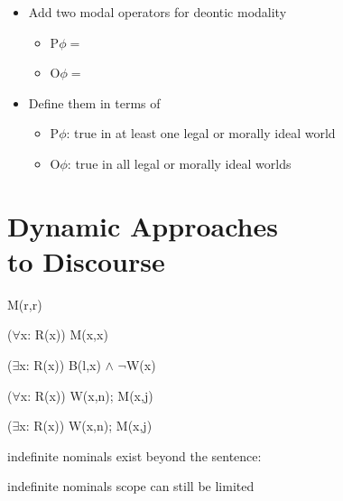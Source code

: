\documentclass[headrule,footrule]{foils}
\begin{document}
\begin{itemize}
\item Add two modal operators for deontic modality
  \begin{itemize}
  \item P$\phi =$ 
  \item O$\phi =$ 
  \end{itemize}
\item Define them in terms of 
  \begin{itemize}
  \item P$\phi$: true in at least one legal or morally ideal world
  \item O$\phi$: true in all legal or morally ideal worlds
  \end{itemize}
\end{itemize}

\section{Dynamic Approaches \\ to Discourse}


\begin{exe}
  \ex 
  \begin{xlist}
    \ex {}
    \ex M(r,r)
  \end{xlist}
 \ex 
  \begin{xlist}
    \ex {}
    \ex ($\forall$x: R(x)) M(x,x)
  \end{xlist}
 \ex 
  \begin{xlist}
    \ex {}
    \ex ($\exists$x: R(x)) B(l,x) $\wedge$ $\neg$W(x)
  \end{xlist}
 \ex 
  \begin{xlist}
    \ex {}
    \ex ($\forall$x: R(x)) W(x,n); M(x,j)\hfill {}
  \end{xlist}
 \ex 
  \begin{xlist}
    \ex {}
    \ex ($\exists$x: R(x)) W(x,n); M(x,j)\hfill {}
  \end{xlist}
  \trans indefinite nominals exist beyond the sentence: 
\ex 
  \begin{xlist}
    \ex {}
  \end{xlist}
  \trans indefinite nominals scope can still be limited
\end{exe}
\end{document}
